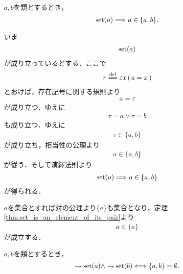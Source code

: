 	\begin{screen}
		\begin{thm}[集合は対の要素たりうる]\label{thm:set_is_an_element_of_its_pair}
			$a,b$を類とするとき，
			\begin{align}
				\operatorname*{set} (a) \Longrightarrow a \in \{a,b\}.
			\end{align}
		\end{thm}
	\end{screen}
	
	\begin{sketch}
		いま
		\begin{align}
			\operatorname*{set} (a)
		\end{align}
		が成り立っているとする．ここで
		\begin{align}
			\tau \defeq \varepsilon x\, (\, a = x\, )
		\end{align}
		とおけば，存在記号に関する規則より
		\begin{align}
			a = \tau
		\end{align}
		が成り立つ．ゆえに
		\begin{align}
			\tau = a \vee \tau = b
		\end{align}
		も成り立つ．ゆえに
		\begin{align}
			\tau \in \{a,b\}
		\end{align}
		が成り立ち，相当性の公理より
		\begin{align}
			a \in \{a,b\}
		\end{align}
		が従う．そして演繹法則より\
		\begin{align}
			\operatorname*{set} (a) \Longrightarrow a \in \{a,b\}
		\end{align}
		が得られる．
		\QED
	\end{sketch}
	
	$a$を集合とすれば対の公理より$\{a\}$も集合となり，定理\ref{thm:set_is_an_element_of_its_pair}より
	\begin{align}
		a \in \{a\}
	\end{align}
	が成立する．
	
	\begin{screen}
		\begin{thm}[真類同士の対は空]\label{thm:pair_of_proper_classes_is_emptyset}
			$a,b$を類とするとき，
			\begin{align}
				\rightharpoondown \operatorname*{set} (a) \wedge \rightharpoondown \operatorname*{set} (b) \Longleftrightarrow \{a,b\} = \emptyset.
			\end{align}
		\end{thm}
	\end{screen}
	
